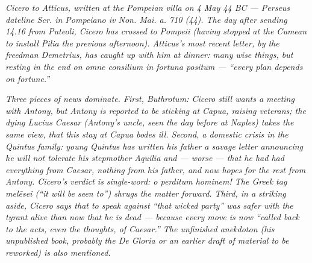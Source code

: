 
\textit{Cicero to Atticus, written at the Pompeian villa on 4
May 44 BC --- Perseus dateline \textit{Scr. in Pompeiano iv Non.
Mai. a. 710 (44)}. The day after sending 14.16 from Puteoli,
Cicero has crossed to Pompeii (having stopped at the Cumean to
install Pilia the previous afternoon). Atticus's most recent
letter, by the freedman Demetrius, has caught up with him at
dinner: many wise things, but resting in the end on \textit{omne
consilium in fortuna positum} --- ``every plan depends on
fortune.''}

\textit{Three pieces of news dominate. First, Buthrotum: Cicero
still wants a meeting with Antony, but Antony is reported to be
sticking at Capua, raising veterans; the dying Lucius Caesar
(Antony's uncle, seen the day before at Naples) takes the same
view, that this stay at Capua bodes ill. Second, a domestic
crisis in the Quintus family: young Quintus has written his
father a savage letter announcing he will not tolerate his
stepmother Aquilia and --- worse --- that he had had everything
from Caesar, nothing from his father, and now hopes for the rest
from Antony. Cicero's verdict is single-word: \textit{o perditum
hominem!} The Greek tag \textit{mel\=esei} (``it will be seen
to'') shrugs the matter forward. Third, in a striking aside,
Cicero says that to speak against ``that wicked party'' was
safer with the tyrant alive than now that he is dead --- because
every move is now ``called back to the acts, even the thoughts,
of Caesar.'' The unfinished \textit{anekdoton} (his unpublished
book, probably the \textit{De Gloria} or an earlier draft of
material to be reworked) is also mentioned.}
